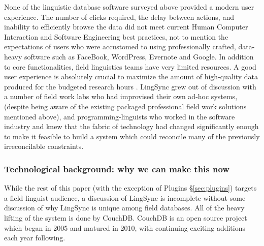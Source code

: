 \documentclass[letterpaper, 12pt, dvips]{mitwpl}
\begin{document}
None of the linguistic database software surveyed above provided a modern user experience.
The number of clicks required, the delay between actions, and inability to efficiently browse the data did not meet current
Human Computer Interaction and Software Engineering best practices, 
not to mention the expectations of users who were accustomed to using professionally crafted, data-heavy software such as FaceBook, WordPress, Evernote and Google. %
In addition to core functionalities, field linguistics teams have very limited resources. 
A good user
experience is absolutely crucial to maximize the amount of high-quality data produced for the budgeted research hours \citep{Palmer:2009}. 
LingSync grew
out of discussion with a number of field work labs who had improvised their own ad-hoc systems, 
(despite being aware of the existing packaged professional field work solutions mentioned above), 
and programming-linguists who worked in the software industry and knew that the fabric of technology had changed significantly enough to make it feasible to build a system which could reconcile many of the previously irreconcilable constraints.


\subsubsection{Technological background: why we can make this now} 

While the rest of this paper (with the exception of Plugins \S \ref{sec:plugins}) targets a field linguist audience, a discussion of LingSync is incomplete without some discussion of why LingSync is unique among field databases. All of the heavy lifting of the system is done by CouchDB. CouchDB is an open source  project which began in 2005 and matured in 2010, with continuing exciting additions each year following. 
\end{document}
